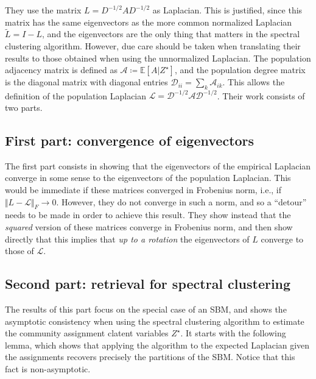 \documentclass[../../main.tex]{subfiles} %
\begin{document}
	 They use the matrix \(L = D^{-1/2} A 
	D^{-1/2}\) as Laplacian. This is justified, since this matrix has the same 
	eigenvectors as the more common normalized Laplacian \(\tilde L = I - L\), 
	and the eigenvectors are the only thing that matters in the spectral 
	clustering algorithm. However, due care should be taken when translating 
	their results to those obtained when using the unnormalized Laplacian. 
	The population adjacency matrix is defined as \(\mathscr A \coloneqq 
	\mathbb E [A \vert Z^{\star}]\), and the population degree matrix is the 
	diagonal matrix with diagonal entries \(\mathscr D_{ii} = \sum_k \mathscr 
	A_{ik}\). This allows the definition of the population Laplacian \(\mathscr 
	L = \mathscr D^{-1/2} \mathscr A \mathscr D^{-1/2}\). Their work consists 
	of two parts.
	
	\subsection{First part: convergence of eigenvectors}
	The first part consists in showing that the eigenvectors of the empirical 
	Laplacian converge in some sense to the eigenvectors of the population 
	Laplacian. This would be immediate if these matrices converged in Frobenius 
	norm, i.e., if \(\Vert L - \mathscr L \Vert_F \to 0\). However, they do not 
	converge in such a norm, and so a ``detour'' needs to be made in order to 
	achieve this result. They show instead that the \textit{squared} version of 
	these matrices converge in Frobenius norm, and then show directly that this 
	implies that \textit{up to a rotation} the eigenvectors of \(L\) converge 
	to those of \(\mathscr L\). 
	
	\subsection{Second part: retrieval for spectral clustering}
	The results of this part focus on the special case of an SBM, and shows the 
	asymptotic consistency when using the spectral clustering algorithm to 
	estimate the community assignment clatent variables \(Z^{\star}\). It 
	starts with the following lemma, which shows that applying the algorithm to 
	the expected Laplacian given the assignments recovers precisely the 
	partitions of the SBM. Notice that this fact is non-asymptotic.
	
\end{document}
